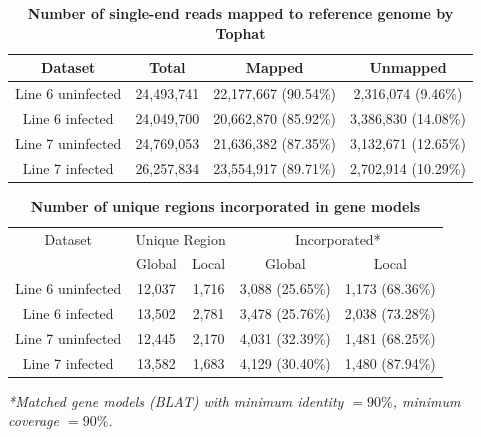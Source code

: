 \documentclass[10pt]{article}
\begin{document}
\begin{table}[!ht]
\caption{
\bf{Number of single-end reads mapped to reference genome by Tophat}}
\begin{tabular}{cccc}
\hline
Dataset & Total & Mapped & Unmapped \\ 
\hline
Line 6 uninfected & 24,493,741 & 22,177,667 (90.54\%)& 2,316,074 (9.46\%) \\
Line 6 infected & 24,049,700 & 20,662,870 (85.92\%)& 3,386,830 (14.08\%) \\
Line 7 uninfected & 24,769,053 & 21,636,382 (87.35\%)& 3,132,671 (12.65\%) \\
Line 7 infected & 26,257,834 & 23,554,917 (89.71\%)& 2,702,914 (10.29\%) \\
\hline
\end{tabular}
\label{junction_read}
\end{table}

\begin{table}[!ht]
\caption{
\bf{Number of unique regions incorporated in gene models}}
\begin{tabular}{ccccc}
\hline
Dataset & \multicolumn{2}{c}{Unique Region} & \multicolumn{2}{c}{Incorporated*}\\
 & Global & Local & Global & Local\\
\hline
Line 6 uninfected & 12,037 & 1,716 & 3,088 (25.65\%) & 1,173 (68.36\%) \\
Line 6 infected & 13,502 & 2,781 & 3,478 (25.76\%) & 2,038 (73.28\%) \\
Line 7 uninfected & 12,445 & 2,170 & 4,031 (32.39\%) & 1,481 (68.25\%) \\
Line 7 infected & 13,582 & 1,683 & 4,129 (30.40\%) & 1,480 (87.94\%) \\
\hline
\end{tabular}
\begin{flushleft}\footnotesize \textit{*Matched gene models (BLAT) with
minimum identity $=90\%$, minimum coverage $=90\%$.}
\end{flushleft}
\label{uniq_regions}
\end{table}
\end{document}
